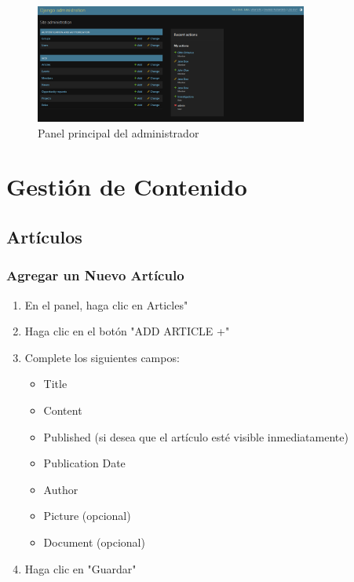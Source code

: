 \documentclass[12pt,letterpaper]{report}
\begin{document}
\begin{figure}[H]
    \centering
    \includegraphics[width=0.8\textwidth]{images/panel.png}
    \caption{Panel principal del administrador}
\end{figure}

\chapter{Gestión de Contenido}

\section{Artículos}
\subsection{Agregar un Nuevo Artículo}
\begin{enumerate}
    \item En el panel, haga clic en  Articles"
    \item Haga clic en el botón "ADD ARTICLE +"
    \item Complete los siguientes campos:
        \begin{itemize}
            \item Title
            \item Content
            \item Published (si desea que el artículo esté visible inmediatamente)
            \item Publication Date
            \item Author
            \item Picture (opcional)
            \item Document (opcional)
        \end{itemize}
    \item Haga clic en "Guardar"
\end{enumerate}
\end{document}
